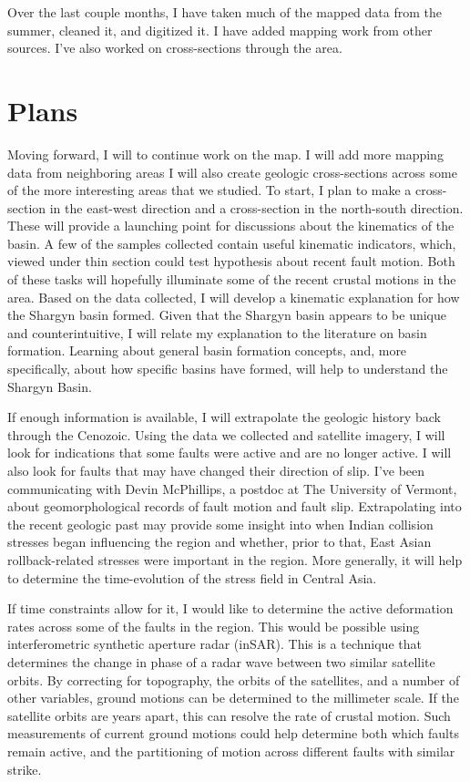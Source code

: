 \documentclass[10pt,a4paper]{article}
\begin{document}
	Over the last couple months, I have taken much of the mapped data from the summer, cleaned it, and digitized it. I have added mapping work from other sources. I've also worked on cross-sections through the area.
\section*{Plans} 
	 Moving forward, I will to continue work on the map. I will add more mapping data from neighboring areas I will also create geologic cross-sections across some of the more interesting areas that we studied. To start, I plan to make a cross-section in the east-west direction and a cross-section in the north-south direction. These will provide a launching point for discussions about the kinematics of the basin. A few of the samples collected contain useful kinematic indicators, which, viewed under thin section could test hypothesis about recent fault motion. Both of these tasks will hopefully illuminate some of the recent crustal motions in the area. Based on the data collected, I will develop a kinematic explanation for how the Shargyn basin formed. Given that the Shargyn basin appears to be unique and counterintuitive, I will relate my explanation to the literature on basin formation. Learning about general basin formation concepts, and, more specifically, about how specific basins have formed, will help to understand the Shargyn Basin.

	If enough information is available, I will extrapolate the geologic history back through the Cenozoic. Using the data we collected and satellite imagery, I will look for indications that some faults were active and are no longer active. I will also look for faults that may have changed their direction of slip. I've been communicating with Devin McPhillips, a postdoc at The University of Vermont, about geomorphological records of fault motion and fault slip. Extrapolating into the recent geologic past may provide some insight into when Indian collision stresses began influencing the region and whether, prior to that, East Asian rollback-related stresses were important in the region. More generally, it will help to determine the time-evolution of the stress field in Central Asia.

	If time constraints allow for it, I would like to determine the active deformation rates across some of the faults in the region. This would be possible using interferometric synthetic aperture radar (inSAR). This is a technique that determines the change in phase of a radar wave between two similar satellite orbits. By correcting for topography, the orbits of the satellites, and a number of other variables, ground motions can be determined to the millimeter scale. If the satellite orbits are years apart, this can resolve the rate of crustal motion. Such measurements of current ground motions could help determine both which faults remain active, and the partitioning of motion across different faults with similar strike.
\end{document}
